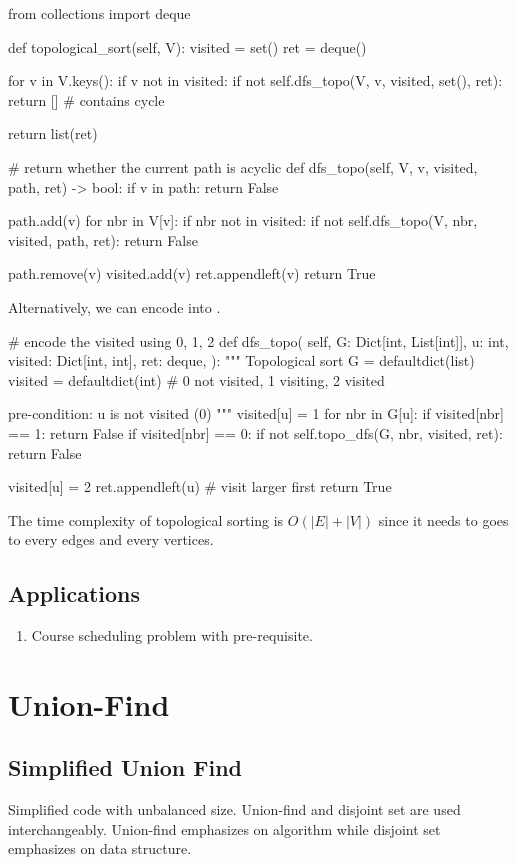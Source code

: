 \begin{python}
from collections import deque

def topological_sort(self, V):
  visited = set()
  ret = deque()

  for v in V.keys():
    if v not in visited:
      if not self.dfs_topo(V, v, visited, set(), ret):
        return []  # contains cycle

  return list(ret)

# return whether the current path is acyclic
def dfs_topo(self, V, v, visited, path, ret) -> bool:
  if v in path:
    return False

  path.add(v)
  for nbr in V[v]:
    if nbr not in visited:
      if not self.dfs_topo(V, nbr, visited, path, ret):
        return False

  path.remove(v)
  visited.add(v)
  ret.appendleft(v)
  return True
\end{python}
Alternatively, we can encode  into . 
\begin{python}
# encode the visited using 0, 1, 2
def dfs_topo(
  self, 
  G: Dict[int, List[int]], 
  u: int, 
  visited: Dict[int, int],
  ret: deque,
):
  """
  Topological sort
  G = defaultdict(list)
  visited = defaultdict(int) 
  # 0 not visited, 1 visiting, 2 visited

  pre-condition: u is not visited (0)
  """
  visited[u] = 1
  for nbr in G[u]:
    if visited[nbr] == 1:
      return False
    if visited[nbr] == 0:
      if not self.topo_dfs(G, nbr, visited, ret):
        return False

  visited[u] = 2
  ret.appendleft(u)  # visit larger first
  return True
\end{python}
The time complexity of topological sorting is $O(|E|+|V|)$ since it needs to goes to every edges and every vertices. 

\subsection{Applications}
\begin{enumerate}
\item Course scheduling problem with pre-requisite.
\end{enumerate}

\section{Union-Find}\label{section:unionFind}
\subsection{Simplified Union Find}
Simplified code with unbalanced size. Union-find and disjoint set are used interchangeably. Union-find emphasizes on algorithm while disjoint set emphasizes on data structure.


